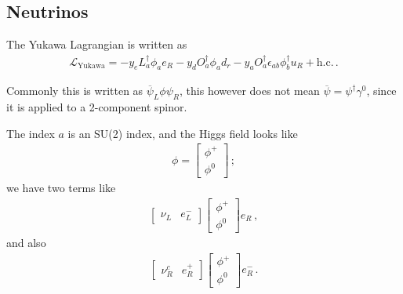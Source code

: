 \documentclass[main.tex]{subfiles}
\begin{document}
\subsection{Neutrinos}


The Yukawa Lagrangian is written as 
%
\begin{align}
\mathscr{L}_{\text{Yukawa}}
= - y_{e} L ^\dag_{a} \phi_{a} e_{R}
-y_{d} O ^\dag_{a} \phi_{a} d_{r}
-y_{a} O ^\dag_{a} \epsilon_{ab} \phi ^\dag_{b} u_{R} 
+ \text{h.c.}
\,.
\end{align}

Commonly this is written as \(\overline{\psi}_{L} \phi \psi_{R}\), this however does not mean \(\overline{\psi} = \psi ^\dag \gamma^{0}\), since it is applied to a 2-component spinor. 

The index \(a\) is an SU(2) index, and the Higgs field looks like 
%
\begin{subequations}
\begin{align}
\phi = \left[\begin{array}{c}
\phi^{+} \\ 
\phi^{0}
\end{array}\right]
\,;
\end{align}
\end{subequations}
%
we have two terms like 
%
\begin{subequations}
\begin{align}
\left[\begin{array}{cc}
\nu_{L} & e^{-}_{L}
\end{array}\right]
\left[\begin{array}{c}
\phi^{+} \\ 
\phi^{0}
\end{array}\right]
e_{R}
\,,
\end{align}
\end{subequations}
%
and also 
%
\begin{subequations}
\begin{align}
\left[\begin{array}{cc}
\nu_{R}^{c} & e^{+}_{R}
\end{array}\right]
\left[\begin{array}{c}
\phi^{+} \\ 
\phi^{0}
\end{array}\right]
e_{R}^{-}
\,.
\end{align}
\end{subequations}
\end{document}
